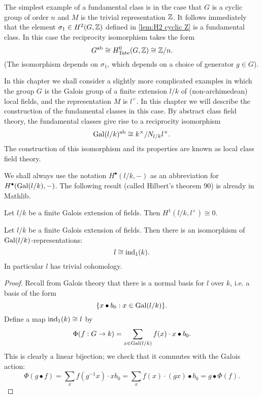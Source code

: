 The simplest example of a fundamental class is in the case
that $G$ is a cyclic group of order $n$ and $M$ is the trivial representation ${\mathbb Z}$.
It follows immediately that the element $\sigma_1 \in H^2(G,{\mathbb Z})$ defined in
\ref{lem:H2 cyclic Z} is a fundamental class.
In this case the reciprocity isomorphism takes the form
\[
	G^{\mathrm{ab}} \cong H^0_{\mathrm{Tate}} (G,{\mathbb Z}) \cong {\mathbb Z}/n.
\]
(The isomorphism depends on $\sigma_1$, which depends on a choice of generator $g \in G$).

In this chapter we shall consider a slightly more complicated examples in which the group $G$ is
the Galois group of a finite extension $l/k$ of (non-archimedean) local fields, and the
representation $M$ is $l^\times$.
In this chapter we will describe the construction of the fundamental classes in this case.
By abstract class field theory, the fundamental classes give rise to a reciprocity isomorphism
\[
	\mathrm{Gal}(l/k)^{\mathrm{ab}} \cong k^\times / N_{l/k} l^\times.
\]
The construction of this isomorphism and its properties are known as local class field theory.

We shall always use the notation $H^\bullet(l/k,-)$ as an abbreviation
for $H^\bullet(\mathrm{Gal}(l/k),-)$.
The following result (called Hilbert's theorem 90) is already in Mathlib.

\begin{theorem}\label{thm:hilbert 90}
	\mathlibok
	Let $l/k$ be a finite Galois extension of fields.
	Then $H^1(l/k, l^\times) \cong 0$.
\end{theorem}

\begin{theorem}\label{thm:additive field trivial}
	Let $l/k$ be a finite Galois extension of fields.
	Then there is an isomorphism of $\mathrm{Gal}(l/k)$-representations:
	\[
		l \cong \mathrm{ind}_1(k).
	\]
	In particular $l$ has trivial cohomology.
\end{theorem}

\begin{proof}
	Recall from Galois theory that there is a normal basis for $l$ over $k$, i.e. a basis of the
	form
	\[
		\{x \bullet b_0 : x \in \mathrm{Gal}(l/k)\}.
	\]
	Define a map $\mathrm{ind}_1(k) \cong l$ by
	\[
		\Phi (f : G \to k) = \sum_{x \in \mathrm{Gal}(l/k)} f(x) \cdot x \bullet b_0.
	\]
	This is clearly a linear bijection; we check that it commutes with the Galois action:
	\[
		\Phi(g\bullet f)
		= \sum_x f(g^{-1}x) \cdot x b_0
		= \sum_x f(x) \cdot (gx) \bullet b_0
		= g \bullet \Phi(f).
	\]
\end{proof}






